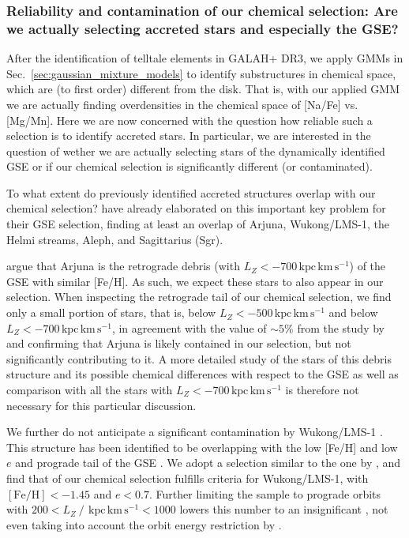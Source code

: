 \documentclass[fleqn,usenatbib]{mnras}
\newcommand{\kpckms}{\,\mathrm{kpc\,km\,s^{-1}}}	%
\begin{document}
\subsubsection{Reliability and contamination of our chemical selection: Are we actually selecting accreted stars and especially the GSE?} \label{sec:reliability_selection}

After the identification of telltale elements in GALAH+ DR3, we apply GMMs in Sec.~\ref{sec:gaussian_mixture_models} to identify substructures in chemical space, which are (to first order) different from the disk. That is, with our applied GMM we are actually finding overdensities in the chemical space of [Na/Fe] vs. [Mg/Mn]. Here we are now concerned with the question how reliable such a selection is to identify accreted stars. In particular, we are interested in the question of wether we are actually selecting stars of the dynamically identified GSE or if our chemical selection is significantly different (or contaminated).

To what extent do previously identified accreted structures overlap with our chemical selection? \citet{Naidu2020} have already elaborated on this important key problem for their GSE selection, finding at least an overlap of Arjuna, Wukong/LMS-1, the Helmi streams, Aleph, and Sagittarius (Sgr).

\citet{Naidu2021} argue that Arjuna is the retrograde debris (with $L_Z < -700 \kpckms$) of the GSE with similar [Fe/H]. As such, we expect these stars to also appear in our selection. When inspecting the retrograde tail of our chemical selection, we find only a small portion of stars, that is,  below $L_Z < -500 \kpckms$ and  below $L_Z < -700 \kpckms$, in agreement with the value of $\sim 5\%$ from the study by \citet{Naidu2021} and confirming that Arjuna is likely contained in our selection, but not significantly contributing to it. A more detailed study of the  stars of this debris structure and its possible chemical differences with respect to the GSE as well as comparison with all the  stars with $L_Z < -700 \kpckms$ is therefore not necessary for this particular discussion.

We further do not anticipate a significant contamination by Wukong/LMS-1 \citep{Yuan2020a, Naidu2020}. This structure has been identified to be overlapping with the low [Fe/H] and low $e$ and prograde tail of the GSE \citep{Naidu2020}. We adopt a selection similar to the one by \citet{Naidu2020}, and find that  of our chemical selection fulfills criteria for Wukong/LMS-1, with $\mathrm{[Fe/H]} < -1.45$ and $e < 0.7$. Further limiting the sample to prograde orbits with $200 < L_Z~/~\kpckms < 1000$ lowers this number to an insignificant , not even taking into account the orbit energy restriction by \citet{Naidu2020}.
\end{document}

